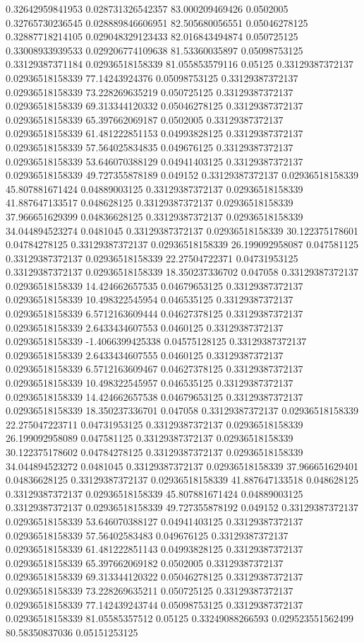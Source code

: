 0.32642959841953 0.028731326542357 83.000209469426 0.0502005
0.32765730236545 0.028889846606951 82.505680056551 0.05046278125
0.32887718214105 0.029048329123433 82.016843494874 0.050725125
0.33008933939533 0.029206774109638 81.53360035897 0.05098753125
0.33129387371184 0.02936518158339 81.055853579116 0.05125
0.33129387372137 0.02936518158339 77.14243924376 0.05098753125
0.33129387372137 0.02936518158339 73.228269635219 0.050725125
0.33129387372137 0.02936518158339 69.313344120332 0.05046278125
0.33129387372137 0.02936518158339 65.397662069187 0.0502005
0.33129387372137 0.02936518158339 61.481222851153 0.04993828125
0.33129387372137 0.02936518158339 57.564025834835 0.049676125
0.33129387372137 0.02936518158339 53.646070388129 0.04941403125
0.33129387372137 0.02936518158339 49.727355878189 0.049152
0.33129387372137 0.02936518158339 45.807881671424 0.04889003125
0.33129387372137 0.02936518158339 41.887647133517 0.048628125
0.33129387372137 0.02936518158339 37.966651629399 0.04836628125
0.33129387372137 0.02936518158339 34.044894523274 0.0481045
0.33129387372137 0.02936518158339 30.122375178601 0.04784278125
0.33129387372137 0.02936518158339 26.199092958087 0.047581125
0.33129387372137 0.02936518158339 22.27504722371 0.04731953125
0.33129387372137 0.02936518158339 18.350237336702 0.047058
0.33129387372137 0.02936518158339 14.424662657535 0.04679653125
0.33129387372137 0.02936518158339 10.498322545954 0.046535125
0.33129387372137 0.02936518158339 6.5712163609444 0.04627378125
0.33129387372137 0.02936518158339 2.6433434607553 0.0460125
0.33129387372137 0.02936518158339 -1.4066399425338 0.04575128125
0.33129387372137 0.02936518158339 2.6433434607555 0.0460125
0.33129387372137 0.02936518158339 6.5712163609467 0.04627378125
0.33129387372137 0.02936518158339 10.498322545957 0.046535125
0.33129387372137 0.02936518158339 14.424662657538 0.04679653125
0.33129387372137 0.02936518158339 18.350237336701 0.047058
0.33129387372137 0.02936518158339 22.275047223711 0.04731953125
0.33129387372137 0.02936518158339 26.199092958089 0.047581125
0.33129387372137 0.02936518158339 30.122375178602 0.04784278125
0.33129387372137 0.02936518158339 34.044894523272 0.0481045
0.33129387372137 0.02936518158339 37.966651629401 0.04836628125
0.33129387372137 0.02936518158339 41.887647133518 0.048628125
0.33129387372137 0.02936518158339 45.807881671424 0.04889003125
0.33129387372137 0.02936518158339 49.727355878192 0.049152
0.33129387372137 0.02936518158339 53.646070388127 0.04941403125
0.33129387372137 0.02936518158339 57.56402583483 0.049676125
0.33129387372137 0.02936518158339 61.481222851143 0.04993828125
0.33129387372137 0.02936518158339 65.397662069182 0.0502005
0.33129387372137 0.02936518158339 69.313344120322 0.05046278125
0.33129387372137 0.02936518158339 73.228269635211 0.050725125
0.33129387372137 0.02936518158339 77.142439243744 0.05098753125
0.33129387372137 0.02936518158339 81.05585357512 0.05125
0.33249088266593 0.029523551562499 80.58350837036 0.05151253125
